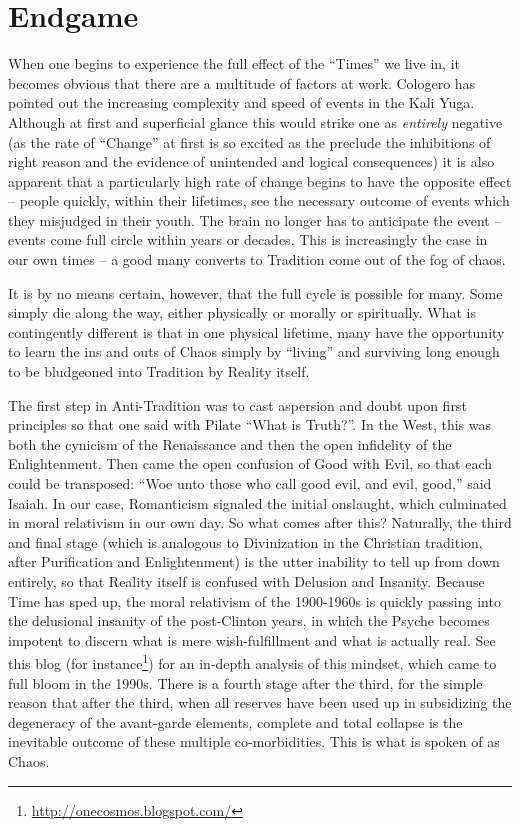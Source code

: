 \section{Endgame}

When one begins to experience the full effect of the ``Times'' we live in, it becomes obvious that there are a multitude of factors at work. Cologero has pointed out the increasing complexity and speed of events in the Kali Yuga. Although at first and superficial glance this would strike one as \emph{entirely} negative (as the rate of ``Change'' at first is so excited as the preclude the inhibitions of right reason and the evidence of unintended and logical consequences) it is also apparent that a particularly high rate of change begins to have the opposite effect -- people quickly, within their lifetimes, see the necessary outcome of events which they misjudged in their youth. The brain no longer has to anticipate the event -- events come full circle within years or decades. This is increasingly the case in our own times -- a good many converts to Tradition come out of the fog of chaos.

It is by no means certain, however, that the full cycle is possible for many. Some simply die along the way, either physically or morally or spiritually. What is contingently different is that in one physical lifetime, many have the opportunity to learn the ins and outs of Chaos simply by ``living'' and surviving long enough to be bludgeoned into Tradition by Reality itself.

The first step in Anti-Tradition was to cast aspersion and doubt upon first principles so that one said with Pilate ``What is Truth?''. In the West, this was both the cynicism of the Renaissance and then the open infidelity of the Enlightenment. Then came the open confusion of Good with Evil, so that each could be transposed: ``Woe unto those who call good evil, and evil, good,'' said Isaiah. In our case, Romanticism signaled the initial onslaught, which culminated in moral relativism in our own day. So what comes after this? Naturally, the third and final stage (which is analogous to Divinization in the Christian tradition, after Purification and Enlightenment) is the utter inability to tell up from down entirely, so that Reality itself is confused with Delusion and Insanity. Because Time has sped up, the moral relativism of the 1900-1960s is quickly passing into the delusional insanity of the post-Clinton years, in which the Psyche becomes impotent to discern what is mere wish-fulfillment and what is actually real. See this blog (for instance\footnote{\url{http://onecosmos.blogspot.com/}}) for an in-depth analysis of this mindset, which came to full bloom in the 1990s. There is a fourth stage after the third, for the simple reason that after the third, when all reserves have been used up in subsidizing the degeneracy of the avant-garde elements, complete and total collapse is the inevitable outcome of these multiple co-morbidities. This is what is spoken of as Chaos.

